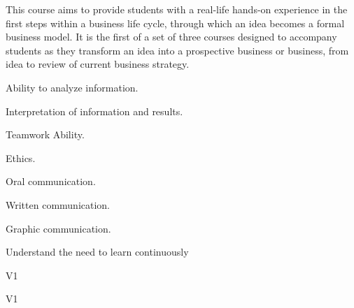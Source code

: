 \begin{syllabus}


\begin{justification}
This course aims to provide students with a real-life hands-on experience in the first steps within a business life cycle, through which an idea becomes a formal business model.
It is the first of a set of three courses designed to accompany students as they transform an idea into a prospective business or business, from idea to review of current business strategy.
\end{justification}

\begin{goals}
   \item Ability to analyze information.
   \item Interpretation of information and results.
   \item Teamwork Ability.
   \item Ethics.
   \item Oral communication.
   \item Written communication.
   \item Graphic communication.
   \item Understand the need to learn continuously
\end{goals}

\begin{outcomes}{V1}
    \item {} %
    \item {} %
    \item {} %
    \item {} %
    \item {} %
\end{outcomes}

\begin{competences}{V1}
    \item {}
    \item {}
    \item {}
\end{competences}


\end{syllabus}
